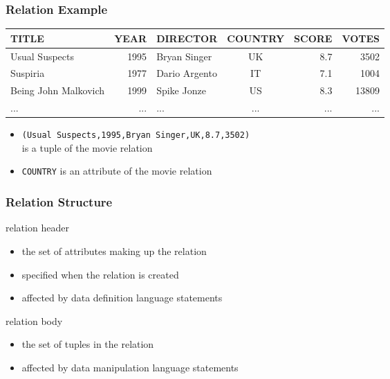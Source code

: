 \documentclass[dvipsnames]{beamer}
\theoremstyle{plain}
\begin{document}
\begin{frame}
  \frametitle{Relation Example}

  \begin{example}
    \begin{tiny}
    \begin{table}
      \begin{tabular}{|l|r|l|c|r|r|}\hline
TITLE                & YEAR & DIRECTOR      & COUNTRY & SCORE & VOTES\\\hline\hline
Usual Suspects       & 1995 & Bryan Singer  & UK      &   8.7 &  3502\\\hline
Suspiria             & 1977 & Dario Argento & IT      &   7.1 &  1004\\\hline
Being John Malkovich & 1999 & Spike Jonze   & US      &   8.3 & 13809\\\hline
...                  &  ... & ...           & ...     &   ... &   ...\\\hline
      \end{tabular}
    \end{table}
    \end{tiny}

    \pause
    \begin{itemize}
      \item \texttt{(Usual Suspects,1995,Bryan Singer,UK,8.7,3502)}\\
        is a tuple of the movie relation
      \item \texttt{COUNTRY} is an attribute of the movie relation
    \end{itemize}
  \end{example}
\end{frame}

\begin{frame}
  \frametitle{Relation Structure}

  \begin{block}{relation header}
    \begin{itemize}
      \item the set of attributes making up the relation
      \item specified when the relation is created
      \item affected by data definition language statements
    \end{itemize}
  \end{block}

  \pause
  \begin{block}{relation body}
    \begin{itemize}
      \item the set of tuples in the relation
      \item affected by data manipulation language statements
    \end{itemize}
  \end{block}
\end{frame}
\end{document}
